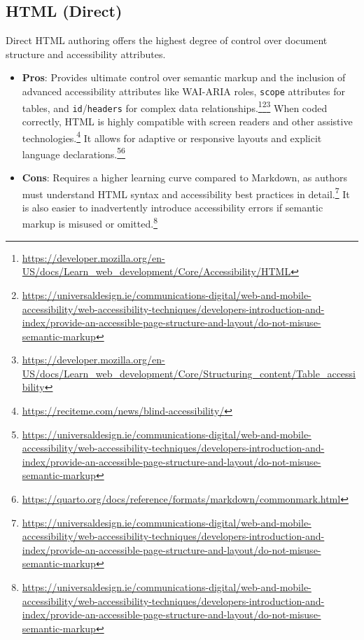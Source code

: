\subsection{HTML (Direct)}
Direct HTML authoring offers the highest degree of control over document structure and accessibility attributes.
\begin{itemize}[noitemsep,topsep=0pt]
    \item \textbf{Pros}: Provides ultimate control over semantic markup and the inclusion of advanced accessibility attributes like WAI-ARIA roles, \texttt{scope} attributes for tables, and \texttt{id}/\texttt{headers} for complex data relationships.\footnote{\url{https://developer.mozilla.org/en-US/docs/Learn_web_development/Core/Accessibility/HTML}}\footnote{\url{https://universaldesign.ie/communications-digital/web-and-mobile-accessibility/web-accessibility-techniques/developers-introduction-and-index/provide-an-accessible-page-structure-and-layout/do-not-misuse-semantic-markup}}\footnote{\url{https://developer.mozilla.org/en-US/docs/Learn_web_development/Core/Structuring_content/Table_accessibility}} When coded correctly, HTML is highly compatible with screen readers and other assistive technologies.\footnote{\url{https://reciteme.com/news/blind-accessibility/}} It allows for adaptive or responsive layouts and explicit language declarations.\footnote{\url{https://universaldesign.ie/communications-digital/web-and-mobile-accessibility/web-accessibility-techniques/developers-introduction-and-index/provide-an-accessible-page-structure-and-layout/do-not-misuse-semantic-markup}}\footnote{\url{https://quarto.org/docs/reference/formats/markdown/commonmark.html}}
    \item \textbf{Cons}: Requires a higher learning curve compared to Markdown, as authors must understand HTML syntax and accessibility best practices in detail.\footnote{\url{https://universaldesign.ie/communications-digital/web-and-mobile-accessibility/web-accessibility-techniques/developers-introduction-and-index/provide-an-accessible-page-structure-and-layout/do-not-misuse-semantic-markup}} It is also easier to inadvertently introduce accessibility errors if semantic markup is misused or omitted.\footnote{\url{https://universaldesign.ie/communications-digital/web-and-mobile-accessibility/web-accessibility-techniques/developers-introduction-and-index/provide-an-accessible-page-structure-and-layout/do-not-misuse-semantic-markup}}
\end{itemize}

